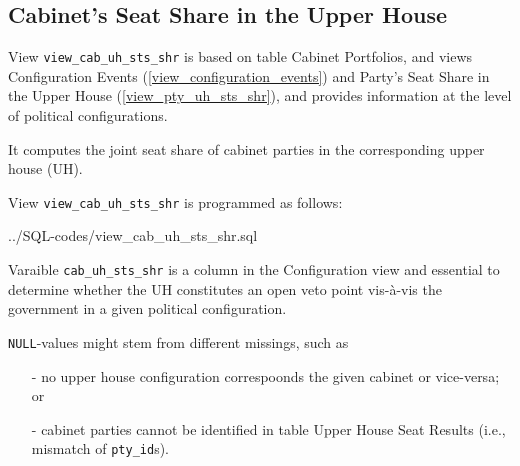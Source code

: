 \subsection{Cabinet's Seat Share in the Upper House}\label{view_cab_uh_sts_shr}
View \texttt{\footnotesize view\_cab\_uh\_sts\_shr} is based on table Cabinet Portfolios, and views Configuration Events (\ref{view_configuration_events}) and Party's Seat Share in the Upper House (\ref{view_pty_uh_sts_shr}), and provides information at the level of political configurations. 

It computes the joint seat share of cabinet parties in the corresponding upper house (UH).

View \texttt{\footnotesize view\_cab\_uh\_sts\_shr} is programmed as follows:

%
{../SQL-codes/view_cab_uh_sts_shr.sql}

Varaible \texttt{\footnotesize cab\_uh\_sts\_shr} is a column in the Configuration view and essential to determine whether the UH constitutes an open veto point vis-à-vis the government in a given political configuration.

\texttt{\footnotesize NULL}-values might stem from different missings, such as 
\begin{itemize}
\item[-]no upper house configuration correspoonds the given cabinet or vice-versa; or
\item[-]cabinet parties cannot be identified in table Upper House Seat Results (i.e., mismatch of \texttt{\footnotesize pty\_id}s).
\end{itemize}



